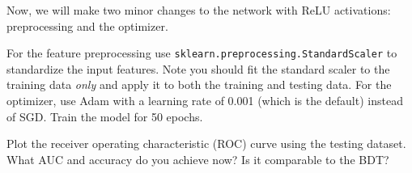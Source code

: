 \begin{problem}[5]
Now, we will make two minor changes to the network with ReLU activations: preprocessing and the optimizer.

For the feature preprocessing use \texttt{sklearn.preprocessing.StandardScaler} to standardize the input features.
Note you should fit the standard scaler to the training data \emph{only} and apply it to both the training and testing data.
For the optimizer, use Adam with a learning rate of 0.001 (which is the default) instead of SGD. Train the model for 50 epochs.

Plot the receiver operating characteristic (ROC) curve using the testing dataset.
What AUC and accuracy do you achieve now?
Is it comparable to the BDT?
\end{problem}



